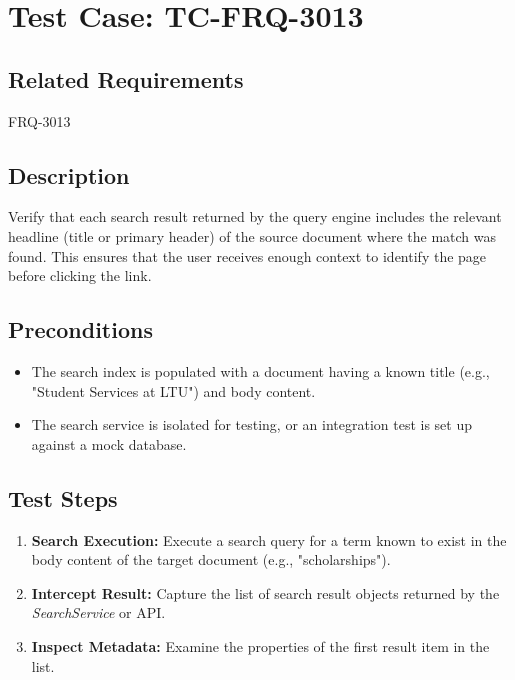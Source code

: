 \documentclass{article}
\begin{document}
\section{Test Case: TC-FRQ-3013}
\subsection*{Related Requirements}
FRQ-3013

\subsection*{Description}
Verify that each search result returned by the query engine includes the relevant headline 
(title or primary header) of the source document where the match was found. This ensures that the user 
receives enough context to identify the page before clicking the link.

\subsection*{Preconditions}
\begin{itemize}
  \item The search index is populated with a document having a known title (e.g., "Student Services at LTU") and body content.
  \item The search service is isolated for testing, or an integration test is set up against a mock database.
\end{itemize}

\subsection*{Test Steps}
\begin{enumerate}
  \item \textbf{Search Execution:} Execute a search query for a term known to exist in the body content of the target document (e.g., "scholarships").
  \item \textbf{Intercept Result:} Capture the list of search result objects returned by the \textit{SearchService} or API.
  \item \textbf{Inspect Metadata:} Examine the properties of the first result item in the list.
\end{enumerate}
\end{document}
